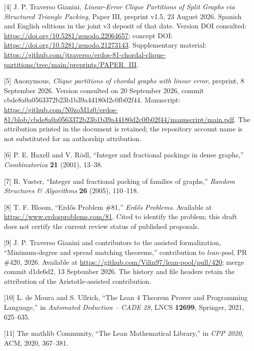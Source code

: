 \documentclass[english,11pt,a4paper]{article}
\begin{document}
{[}4{]} J. P. Traverso Gianini, \emph{Linear-Error Clique Partitions of Split Graphs via Structured Triangle Packing}, Paper III, preprint v1.5, 23 August 2026. Spanish and English editions in the joint v3 deposit of that date. Version DOI consulted: \url{https://doi.org/10.5281/zenodo.22064657}; concept DOI: \url{https://doi.org/10.5281/zenodo.21273143}. Supplementary material: \url{https://github.com/jtraverso/erdos-81-chordal-clique-partitions/tree/main/preprints/PAPER_III}.

{[}5{]} Anonymous, \emph{Clique partitions of chordal graphs with linear error}, preprint, 8 September 2026. Version consulted on 20 September 2026, commit {\ttfamily\small cbde8a0a0563\discretionary{\hbox{\ensuremath{\hookrightarrow}}}{}{}372b23b1b39a\discretionary{\hbox{\ensuremath{\hookrightarrow}}}{}{}44180d2c0fb0\discretionary{\hbox{\ensuremath{\hookrightarrow}}}{}{}2f44}. Manuscript: \url{https://github.com/N0zoM1z0/erdos-81/blob/cbde8a0a0563372b23b1b39a44180d2c0fb02f44/manuscript/main.pdf}. The attribution printed in the document is retained; the repository account name is not substituted for an authorship attribution.

{[}6{]} P. E. Haxell and V. Rödl, ``Integer and fractional packings in dense graphs,'' \emph{Combinatorica} \textbf{21} (2001), 13--38.

{[}7{]} R. Yuster, ``Integer and fractional packing of families of graphs,'' \emph{Random Structures \& Algorithms} \textbf{26} (2005), 110--118.

{[}8{]} T. F. Bloom, ``Erdős Problem \#81,'' \emph{Erdős Problems}. Available at \url{https://www.erdosproblems.com/81}. Cited to identify the problem; this draft does not certify the current review status of published proposals.

{[}9{]} J. P. Traverso Gianini and contributors to the assisted formalization, ``Minimum-degree and spread matching theorems,'' contribution to \emph{lean-pool}, PR \#420, 2026. Available at \url{https://github.com/Vilin97/lean-pool/pull/420}; merge commit {\ttfamily\small d1de6d2}, 13 September 2026. The history and file headers retain the attribution of the Aristotle-assisted contribution.

\clearpage
{[}10{]} L. de Moura and S. Ullrich, ``The Lean 4 Theorem Prover and Programming Language,'' in \emph{Automated Deduction -- CADE 28}, LNCS \textbf{12699}, Springer, 2021, 625--635.

{[}11{]} The mathlib Community, ``The Lean Mathematical Library,'' in \emph{CPP 2020}, ACM, 2020, 367--381.
\end{document}
